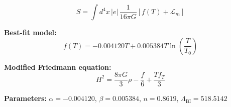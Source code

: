 
\begin{equation}
  S = \int d^4x \, |e| \, \frac{1}{16\pi G} \left[ f(T) + \mathcal{L}_m \right]
\end{equation}

\textbf{Best-fit model:}
\begin{equation}
  f(T) = -0.004120 T + 0.005384 T \ln\!\left(\frac{T}{T_0}\right)
\end{equation}

\textbf{Modified Friedmann equation:}
\begin{equation}
  H^2 = \frac{8\pi G}{3} \rho - \frac{f}{6} + \frac{T f_T}{3}
\end{equation}

\textbf{Parameters:}
$\alpha = -0.004120$, \quad
$\beta = 0.005384$, \quad
$n = 0.8619$, \quad
$\Lambda_{\text{BI}} = 518.5142$